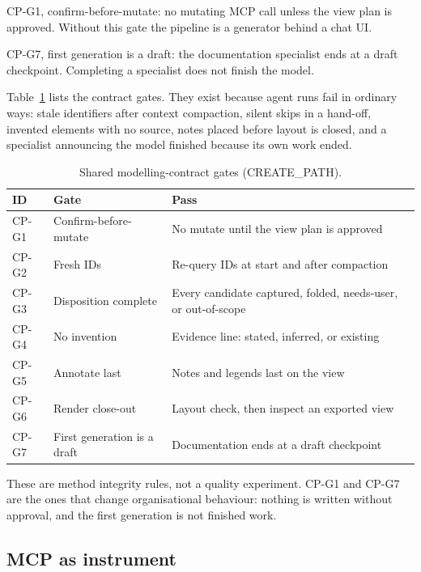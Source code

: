 \documentclass[10pt,journal,compsoc]{IEEEtran}
\begin{document}
CP-G1, confirm-before-mutate: no mutating MCP call unless the view plan is approved. Without this gate the pipeline is a generator behind a chat UI.

CP-G7, first generation is a draft: the documentation specialist ends at a draft checkpoint. Completing a specialist does not finish the model.

Table~\ref{tab:gates} lists the contract gates. They exist because agent runs fail in ordinary ways: stale identifiers after context compaction, silent skips in a hand-off, invented elements with no source, notes placed before layout is closed, and a specialist announcing the model finished because its own work ended.

\begin{table}[!t]
\caption{Shared modelling-contract gates (CREATE\_PATH).}
\label{tab:gates}
\centering
{\scriptsize
\begin{tabularx}{\columnwidth}{@{}l >{\raggedright\arraybackslash}p{} >{\raggedright\arraybackslash}X@{}}
\toprule
\textbf{ID} & \textbf{Gate} & \textbf{Pass} \\
\midrule
CP-G1 & Confirm-before-mutate & No mutate until the view plan is approved \\
CP-G2 & Fresh IDs & Re-query IDs at start and after compaction \\
CP-G3 & Disposition complete & Every candidate captured, folded, needs-user, or out-of-scope \\
CP-G4 & No invention & Evidence line: stated, inferred, or existing \\
CP-G5 & Annotate last & Notes and legends last on the view \\
CP-G6 & Render close-out & Layout check, then inspect an exported view \\
CP-G7 & First generation is a draft & Documentation ends at a draft checkpoint \\
\bottomrule
\end{tabularx}}
\end{table}

These are method integrity rules, not a quality experiment. CP-G1 and CP-G7 are the ones that change organisational behaviour: nothing is written without approval, and the first generation is not finished work.

\subsection{MCP as instrument}
\end{document}
